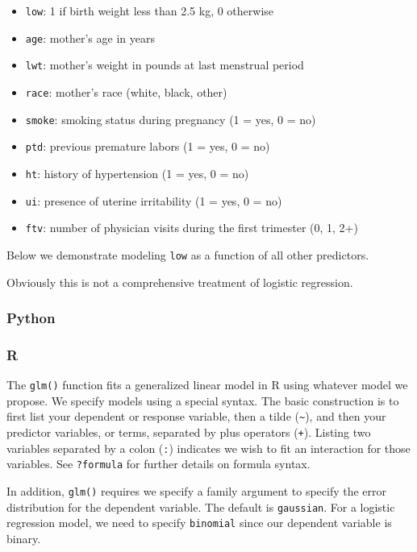 \documentclass[
]{book}
\providecommand{\tightlist}{%
  \setlength{\itemsep}{0pt}\setlength{\parskip}{0pt}}
\begin{document}
\begin{itemize}
\tightlist
\item
  \texttt{low}: 1 if birth weight less than 2.5 kg, 0 otherwise
\item
  \texttt{age}: mother's age in years
\item
  \texttt{lwt}: mother's weight in pounds at last menstrual period
\item
  \texttt{race}: mother's race (white, black, other)
\item
  \texttt{smoke}: smoking status during pregnancy (1 = yes, 0 = no)
\item
  \texttt{ptd}: previous premature labors (1 = yes, 0 = no)
\item
  \texttt{ht}: history of hypertension (1 = yes, 0 = no)
\item
  \texttt{ui}: presence of uterine irritability (1 = yes, 0 = no)
\item
  \texttt{ftv}: number of physician visits during the first trimester (0, 1, 2+)
\end{itemize}

Below we demonstrate modeling \texttt{low} as a function of all other predictors.

Obviously this is not a comprehensive treatment of logistic regression.

\hypertarget{python-50}{%
\subsubsection*{Python}\label{python-50}}

\hypertarget{r-50}{%
\subsubsection*{R}\label{r-50}}

The \texttt{glm()} function fits a generalized linear model in R using whatever model we propose. We specify models using a special syntax. The basic construction is to first list your dependent or response variable, then a tilde (\texttt{\textasciitilde{}}), and then your predictor variables, or terms, separated by plus operators (\texttt{+}). Listing two variables separated by a colon (\texttt{:}) indicates we wish to fit an interaction for those variables. See \texttt{?formula} for further details on formula syntax.

In addition, \texttt{glm()} requires we specify a family argument to specify the error distribution for the dependent variable. The default is \texttt{gaussian}. For a logistic regression model, we need to specify \texttt{binomial} since our dependent variable is binary.
\end{document}
